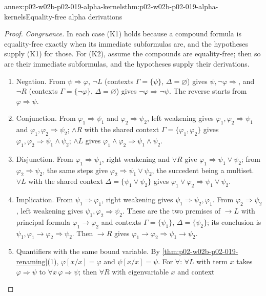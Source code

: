 \begin{annexitem}{annex:p02-w02b-p02-019-alpha-kernels}{thm:p02-w02b-p02-019-alpha-kernels}{Equality-free alpha derivations}
\begin{proof}
\emph{Congruence.}  In each case (K1) holds because a compound formula is
equality-free exactly when its immediate subformulas are, and the
hypotheses supply (K1) for those.  For (K2), assume the compounds are
equality-free; then so are their immediate subformulas, and the hypotheses
supply their derivations.
\begin{enumerate}
 \item Negation.  From \(\psi\Rightarrow\varphi\), \(\neg L\) (contexts
   \(\Gamma=\{\psi\}\), \(\Delta=\varnothing\)) gives
   \(\psi,\neg\varphi\Rightarrow\), and \(\neg R\) (contexts
   \(\Gamma=\{\neg\varphi\}\), \(\Delta=\varnothing\)) gives
   \(\neg\varphi\Rightarrow\neg\psi\).  The reverse starts from
   \(\varphi\Rightarrow\psi\).
 \item Conjunction.  From \(\varphi_1\Rightarrow\psi_1\) and
   \(\varphi_2\Rightarrow\psi_2\), left weakening gives
   \(\varphi_1,\varphi_2\Rightarrow\psi_1\) and
   \(\varphi_1,\varphi_2\Rightarrow\psi_2\); \(\land R\) with the shared
   context \(\Gamma=\{\varphi_1,\varphi_2\}\) gives
   \(\varphi_1,\varphi_2\Rightarrow\psi_1\land\psi_2\); \(\land L\) gives
   \(\varphi_1\land\varphi_2\Rightarrow\psi_1\land\psi_2\).
 \item Disjunction.  From \(\varphi_1\Rightarrow\psi_1\), right weakening
   and \(\lor R\) give \(\varphi_1\Rightarrow\psi_1\lor\psi_2\); from
   \(\varphi_2\Rightarrow\psi_2\), the same steps give
   \(\varphi_2\Rightarrow\psi_1\lor\psi_2\), the succedent being a multiset.
   \(\lor L\) with the shared context \(\Delta=\{\psi_1\lor\psi_2\}\) gives
   \(\varphi_1\lor\varphi_2\Rightarrow\psi_1\lor\psi_2\).
 \item Implication.  From \(\psi_1\Rightarrow\varphi_1\), right weakening
   gives \(\psi_1\Rightarrow\psi_2,\varphi_1\).  From
   \(\varphi_2\Rightarrow\psi_2\), left weakening gives
   \(\psi_1,\varphi_2\Rightarrow\psi_2\).  These are the two premises of
   \(\to L\) with principal formula \(\varphi_1\to\varphi_2\) and contexts
   \(\Gamma=\{\psi_1\}\), \(\Delta=\{\psi_2\}\); its conclusion is
   \(\psi_1,\varphi_1\to\varphi_2\Rightarrow\psi_2\).  Then \(\to R\) gives
   \(\varphi_1\to\varphi_2\Rightarrow\psi_1\to\psi_2\).
 \item Quantifiers with the same bound variable.  By
   \cref{thm:p02-w02b-p02-019-renaming}(1), \(\varphi[x/x]=\varphi\) and
   \(\psi[x/x]=\psi\).  For \(\forall\): \(\forall L\) with term \(x\) takes
   \(\varphi\Rightarrow\psi\) to \(\forall x\,\varphi\Rightarrow\psi\); then
   \(\forall R\) with eigenvariable \(x\) and context

\end{enumerate}
\end{proof}
\end{annexitem}
